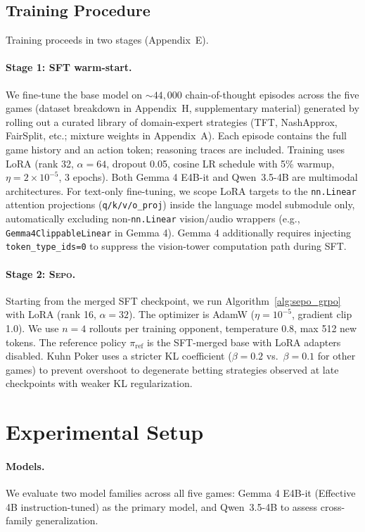 \documentclass[letterpaper]{article} %
\newcommand{\sepo}{\textsc{Sepo}}
\begin{document}
\subsection{Training Procedure}
\label{sec:training}
Training proceeds in two stages (Appendix~E).
\paragraph{Stage 1: SFT warm-start.} We fine-tune the base model on ${\sim}44{,}000$ chain-of-thought episodes across the five games (dataset breakdown in Appendix~H, supplementary material) generated by rolling out a curated library of domain-expert strategies (TFT, NashApprox, FairSplit, etc.; mixture weights in Appendix~A). Each episode contains the full game history and an action token; reasoning traces are included. Training uses LoRA (rank 32, $\alpha = 64$, dropout 0.05, cosine LR schedule with 5\% warmup, $\eta = 2 \times 10^{-5}$, 3 epochs). Both Gemma 4 E4B-it and Qwen~3.5-4B are multimodal architectures. For text-only fine-tuning, we scope LoRA \citep{hu2022lora} targets to the \texttt{nn.Linear} attention projections (\texttt{q/k/v/o\_proj}) inside the language model submodule only, automatically excluding non-\texttt{nn.Linear} vision/audio wrappers (e.g., \texttt{Gemma4ClippableLinear} in Gemma 4). Gemma 4 additionally requires injecting \texttt{token\_type\_ids=0} to suppress the vision-tower computation path during SFT.
\paragraph{Stage 2: \sepo{}.} Starting from the merged SFT checkpoint, we run Algorithm~\ref{alg:sepo_grpo} with LoRA (rank 16, $\alpha = 32$). The optimizer is AdamW ($\eta = 10^{-5}$, gradient clip 1.0). We use $n = 4$ rollouts per training opponent, temperature 0.8, max 512 new tokens. The reference policy $\pi_{\mathrm{ref}}$ is the SFT-merged base with LoRA adapters disabled. Kuhn Poker uses a stricter KL coefficient ($\beta = 0.2$ vs.\ $\beta = 0.1$ for other games) to prevent overshoot to degenerate betting strategies observed at late checkpoints with weaker KL regularization.
\section{Experimental Setup}
\label{sec:setup}
\paragraph{Models.} We evaluate two model families across all five games: Gemma 4 E4B-it \citep{gemmateam2026gemma4} (Effective 4B instruction-tuned) as the primary model, and Qwen~3.5-4B \citep{qwen2026report} to assess cross-family generalization.
\end{document}
